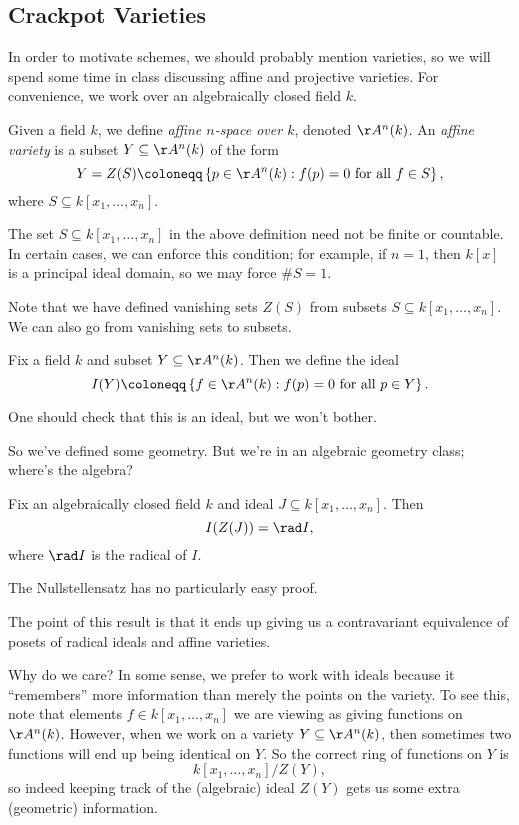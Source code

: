 \documentclass[../notes.tex]{subfiles}
\begin{document}
\subsection{Crackpot Varieties}
In order to motivate schemes, we should probably mention varieties, so we will spend some time in class discussing affine and projective varieties. For convenience, we work over an algebraically closed field $k$.
\begin{definition}
	Given a field $k$, we define \textit{affine $n$-space over $k$}, denoted $\AA^n(k)$. An \textit{affine variety} is a subset $Y\subseteq\AA^n(k)$ of the form
	\[Y=Z(S)\coloneqq\left\{p\in\AA^n(k):f(p)=0\text{ for all }f\in S\right\},\]
	where $S\subseteq k[x_1,\ldots,x_n]$.
\end{definition}
\begin{remark}
	The set $S\subseteq k[x_1,\ldots,x_n]$ in the above definition need not be finite or countable. In certain cases, we can enforce this condition; for example, if $n=1$, then $k[x]$ is a principal ideal domain, so we may force $\#S=1$.
\end{remark}
Note that we have defined vanishing sets $Z(S)$ from subsets $S\subseteq k[x_1,\ldots,x_n]$. We can also go from vanishing sets to subsets.
\begin{definition}
	Fix a field $k$ and subset $Y\subseteq\AA^n(k)$. Then we define the ideal
	\[I(Y)\coloneqq\left\{f\in\AA^n(k):f(p)=0\text{ for all }p\in Y\right\}.\]
\end{definition}
\begin{remark}
	One should check that this is an ideal, but we won't bother.
\end{remark}
So we've defined some geometry. But we're in an algebraic geometry class; where's the algebra?
\begin{theorem}
	Fix an algebraically closed field $k$ and ideal $J\subseteq k[x_1,\ldots,x_n]$.  Then
	\[I(Z(J))=\rad I,\]
	where $\rad I$ is the radical of $I$.
\end{theorem}
\begin{remark}
	The Nullstellensatz has no particularly easy proof.
\end{remark}
The point of this result is that it ends up giving us a contravariant equivalence of posets of radical ideals and affine varieties.

Why do we care? In some sense, we prefer to work with ideals because it ``remembers'' more information than merely the points on the variety. To see this, note that elements $f\in k[x_1,\ldots,x_n]$ we are viewing as giving functions on $\AA^n(k)$. However, when we work on a variety $Y\subseteq\AA^n(k)$, then sometimes two functions will end up being identical on $Y$. So the correct ring of functions on $Y$ is
\[k[x_1,\ldots,x_n]/Z(Y),\]
so indeed keeping track of the (algebraic) ideal $Z(Y)$ gets us some extra (geometric) information.
\end{document}
